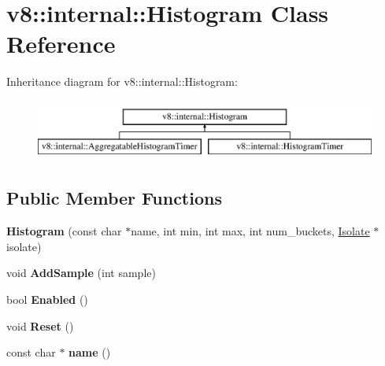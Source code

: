 \hypertarget{classv8_1_1internal_1_1_histogram}{}\section{v8\+:\+:internal\+:\+:Histogram Class Reference}
\label{classv8_1_1internal_1_1_histogram}
Inheritance diagram for v8\+:\+:internal\+:\+:Histogram\+:\begin{figure}[H]
\begin{center}
\leavevmode
\includegraphics[height=2.000000cm]{classv8_1_1internal_1_1_histogram}
\end{center}
\end{figure}
\subsection*{Public Member Functions}
\begin{DoxyCompactItemize}
\item 
{\bfseries Histogram} (const char $\ast$name, int min, int max, int num\+\_\+buckets, \hyperlink{classv8_1_1internal_1_1_isolate}{Isolate} $\ast$isolate)\hypertarget{classv8_1_1internal_1_1_histogram_a0c78098797ab2745d447867241391696}{}\label{classv8_1_1internal_1_1_histogram_a0c78098797ab2745d447867241391696}

\item 
void {\bfseries Add\+Sample} (int sample)\hypertarget{classv8_1_1internal_1_1_histogram_a1fa018dc2756acdc3a1bb4fdbe97ae86}{}\label{classv8_1_1internal_1_1_histogram_a1fa018dc2756acdc3a1bb4fdbe97ae86}

\item 
bool {\bfseries Enabled} ()\hypertarget{classv8_1_1internal_1_1_histogram_a8c6f22e6b5446dfc455a8af4e97eb21b}{}\label{classv8_1_1internal_1_1_histogram_a8c6f22e6b5446dfc455a8af4e97eb21b}

\item 
void {\bfseries Reset} ()\hypertarget{classv8_1_1internal_1_1_histogram_a74a1b1e9c261914088b73e0b36bbb737}{}\label{classv8_1_1internal_1_1_histogram_a74a1b1e9c261914088b73e0b36bbb737}

\item 
const char $\ast$ {\bfseries name} ()\hypertarget{classv8_1_1internal_1_1_histogram_a22b3415f2c6489eb208ae2f742061e6c}{}\label{classv8_1_1internal_1_1_histogram_a22b3415f2c6489eb208ae2f742061e6c}

\end{DoxyCompactItemize}
